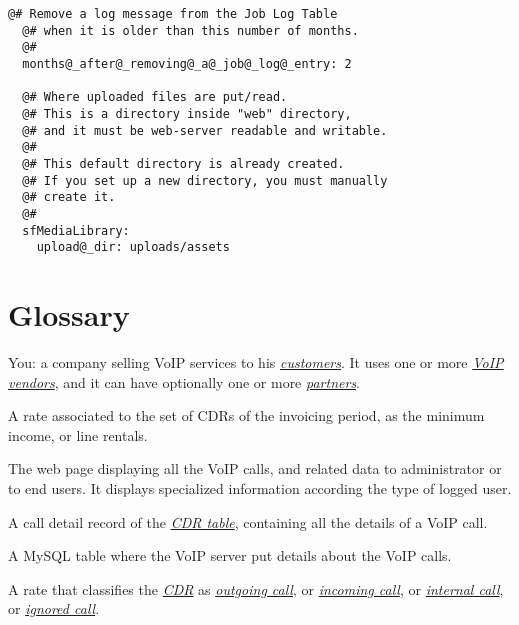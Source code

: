 \documentclass[letterpaper,10pt,english]{sphinxmanual}
\begin{document}
\begin{Verbatim}[commandchars=@\[\]]
  @# Remove a log message from the Job Log Table 
  @# when it is older than this number of months.
  @#
  months@_after@_removing@_a@_job@_log@_entry: 2

  @# Where uploaded files are put/read.
  @# This is a directory inside "web" directory,
  @# and it must be web-server readable and writable.
  @#
  @# This default directory is already created.
  @# If you set up a new directory, you must manually
  @# create it.
  @#
  sfMediaLibrary:
    upload@_dir: uploads/assets
\end{Verbatim}


\chapter{Glossary}
\label{index:glossary}\begin{description}

\item[{Asterisell owner}] \leavevmode{}\label{index:term-asterisell-owner}
You: a company selling VoIP services to his {\hyperref[index:term-customer]{\emph{customers}}}. It uses one or more {\hyperref[index:term-voip-vendor]{\emph{VoIP vendors}}}, and it can have optionally one or more {\hyperref[index:term-partner]{\emph{partners}}}.


\item[{bundle rate}] \leavevmode{}\label{index:term-bundle-rate}
A rate associated to the set of CDRs of the invoicing period, as the minimum income, or line rentals.


\item[{call report}] \leavevmode{}\label{index:term-call-report}
The web page displaying all the VoIP calls, and related data to administrator or to end users. It displays specialized information according the type of logged user.


\item[{CDR}] \leavevmode{}\label{index:term-cdr}
A call detail record of the {\hyperref[index:term-cdr-table]{\emph{CDR table}}}, containing all the details of a VoIP call.


\item[{CDR table}] \leavevmode{}\label{index:term-cdr-table}
A MySQL table where the VoIP server put details about the VoIP calls.


\item[{classification rate}] \leavevmode{}\label{index:term-classification-rate}
A rate that classifies the {\hyperref[index:term-cdr]{\emph{CDR}}} as {\hyperref[index:term-outgoing-call]{\emph{outgoing call}}}, or {\hyperref[index:term-incoming-call]{\emph{incoming call}}}, or {\hyperref[index:term-internal-call]{\emph{internal call}}}, or {\hyperref[index:term-ignored-call]{\emph{ignored call}}}.



\end{description}
\end{document}
